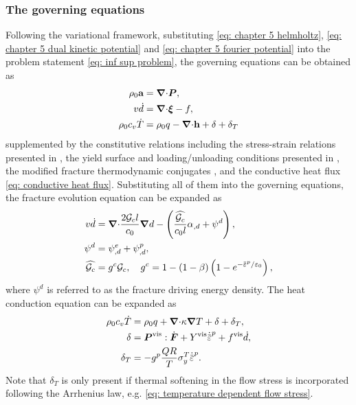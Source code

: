 \subsubsection{The governing equations}

Following the variational framework, substituting \eqref{eq: chapter 5 helmholtz}, \eqref{eq: chapter 5 dual kinetic potential} and \eqref{eq: chapter 5 fourier potential} into the problem statement \eqref{eq: inf sup problem}, the governing equations can be obtained as
\begin{align}
  \rho_0\textbf{a}       & ={\boldsymbol{\nabla} \cdot} \boldsymbol{P},                                \\
  v\dot{d}         & ={\boldsymbol{\nabla} \cdot} \boldsymbol{\xi} - f          ,              \\
  \rho_0c_v\dot{T} & = \rho_0 q - {\boldsymbol{\nabla} \cdot} \textbf{h} + \delta + \delta_T 
\end{align}
supplemented by the constitutive relations including the stress-strain relations presented in , the yield surface and loading/unloading conditions presented in , the modified fracture thermodynamic conjugates , and the conductive heat flux \eqref{eq: conductive heat flux}. Substituting all of them into the governing equations, the fracture evolution equation can be expanded as
\begin{align}
  v\dot{d}      & =\divergence \dfrac{2\Gc l}{c_0} \grad d - \left( \dfrac{\widehat{\Gc}}{c_0 l}\alpha_{,d} + \psi^d \right), \label{eq: modified fracture evolution} \\
  \psi^d        & = \psi^e_{,d} + \psi^p_{,d}, \label{eq: fracture driving energy}                                                                                    \\
  \widehat{\Gc} & = g^c \Gc, \quad g^c = 1-(1-\beta)\left( 1-e^{-\ep/\varepsilon_0} \right),                                                                          
\end{align}
where $\psi^d$ is referred to as the fracture driving energy density. The heat conduction equation can be expanded as
\begin{align}
  \rho_0c_v\dot{T} & = \rho_0 q + \divergence \kappa \grad T + \delta + \delta_T,                 \\
  \delta           & = \bfP^\text{vis}:\dot{\defgrad} + Y^\text{vis}\epdot + f^\text{vis}\dot{d}, \\
  \delta_T         & = -g^p \dfrac{QR}{T} \sigma_y^T\epdot.                                       
\end{align}
Note that $\delta_T$ is only present if thermal softening in the flow stress is incorporated following the Arrhenius law, e.g. \eqref{eq: temperature dependent flow stress}.

